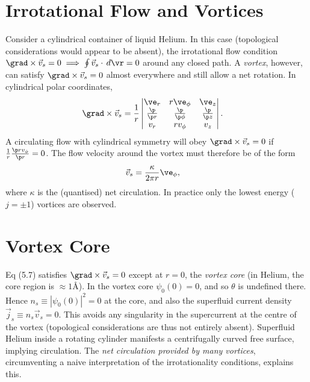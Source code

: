 \documentclass[qo.tex]{subfiles}
\begin{document}
\section{Irrotational Flow and Vortices}
Consider a cylindrical container of liquid Helium. 
In this case (topological considerations would appear to be absent), the irrotational flow condition $\grad\times\vec{v}_s=0\implies\oint\vec{v}_s\cdot\,d\vr=0$ around any closed path.
A \emph{vortex}, however, can satisfy $\grad\times\vec{v}_s=0$ almost everywhere and still allow a net rotation. 
In cylindrical polar coordinates,
\begin{align}
    \grad\times\vec{v}_s &= \frac{1}{r}\begin{vmatrix}\ve_r & r\ve_\phi & \ve_z \\ \frac{\p}{\p r} & \frac{\p}{\p\phi} & \frac{\p}{\p z} \\ v_r & rv_\phi & v_z\end{vmatrix}.
\end{align}
A circulating flow with cylindrical symmetry will obey $\grad\times\vec{v}_s=0$ if $\frac{1}{r}\frac{\p rv_\phi}{\p r}=0$.
The flow velocity around the vortex must therefore be of the form
\begin{align}
    \vec{v}_s &= \frac{\kappa}{2\pi r}\ve_\phi,
\end{align}
where $\kappa$ is the (quantised) net circulation. 
In practice only the lowest energy ($j=\pm1$) vortices are observed.

\section{Vortex Core}
Eq (5.7) satisfies $\grad\times\vec{v}_s=0$ except at $r=0$, the \emph{vortex core} (in Helium, the core region is $\approx1$\AA).
In the vortex core $\psi_0(0)=0$, and so $\theta$ is undefined there.
Hence $n_s\equiv|\psi_0(0)|^2=0$ at the core, and also the superfluid current density $\vec{j}_s\equiv n_s\vec{v}_s=0$.
This avoids any singularity in the supercurrent at the centre of the vortex (topological considerations are thus not entirely absent).
Superfluid Helium inside a rotating cylinder manifests a centrifugally curved free surface, implying circulation.
The \emph{net circulation provided by many vortices}, circumventing a naive interpretation of the irrotationality conditions, explains this.
\end{document}

